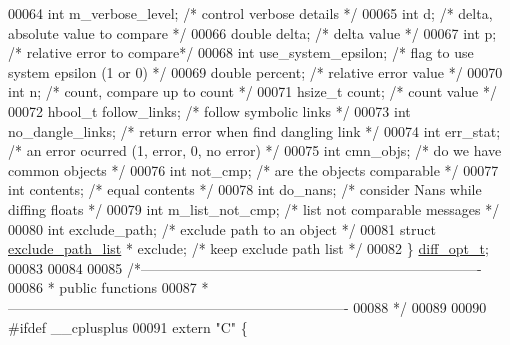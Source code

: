 \begin{DoxyCode}
00064     \textcolor{keywordtype}{int}      m\_verbose\_level;       \textcolor{comment}{/* control verbose details */}
00065     \textcolor{keywordtype}{int}      d;                     \textcolor{comment}{/* delta, absolute value to compare */}
00066     \textcolor{keywordtype}{double}   delta;                 \textcolor{comment}{/* delta value */}
00067     \textcolor{keywordtype}{int}      p;                     \textcolor{comment}{/* relative error to compare*/}
00068     \textcolor{keywordtype}{int}      use\_system\_epsilon;    \textcolor{comment}{/* flag to use system epsilon (1 or 0) */}
00069     \textcolor{keywordtype}{double}   percent;               \textcolor{comment}{/* relative error value */}
00070     \textcolor{keywordtype}{int}      n;                     \textcolor{comment}{/* count, compare up to count */}
00071     hsize\_t  count;                 \textcolor{comment}{/* count value */}
00072     hbool\_t  follow\_links;          \textcolor{comment}{/* follow symbolic links */}
00073     \textcolor{keywordtype}{int}      no\_dangle\_links;       \textcolor{comment}{/* return error when find dangling link */}
00074     \textcolor{keywordtype}{int}      err\_stat;              \textcolor{comment}{/* an error ocurred (1, error, 0, no error) */}
00075     \textcolor{keywordtype}{int}      cmn\_objs;              \textcolor{comment}{/* do we have common objects */}
00076     \textcolor{keywordtype}{int}      not\_cmp;               \textcolor{comment}{/* are the objects comparable */}
00077     \textcolor{keywordtype}{int}      contents;              \textcolor{comment}{/* equal contents */}
00078     \textcolor{keywordtype}{int}      do\_nans;               \textcolor{comment}{/* consider Nans while diffing floats */}
00079     \textcolor{keywordtype}{int}      m\_list\_not\_cmp;        \textcolor{comment}{/* list not comparable messages */}
00080     \textcolor{keywordtype}{int}      exclude\_path;          \textcolor{comment}{/* exclude path to an object */}
00081     \textcolor{keyword}{struct   }\hyperlink{structexclude__path__list}{exclude\_path\_list} * exclude; \textcolor{comment}{/* keep exclude path list */}
00082 \} \hyperlink{structdiff__opt__t}{diff\_opt\_t};
00083 
00084 
00085 \textcolor{comment}{/*-------------------------------------------------------------------------}
00086 \textcolor{comment}{ * public functions}
00087 \textcolor{comment}{ *-------------------------------------------------------------------------}
00088 \textcolor{comment}{ */}
00089 
00090 \textcolor{preprocessor}{#ifdef \_\_cplusplus}
00091 \textcolor{keyword}{extern} \textcolor{stringliteral}{"C"} \{

\end{DoxyCode}
